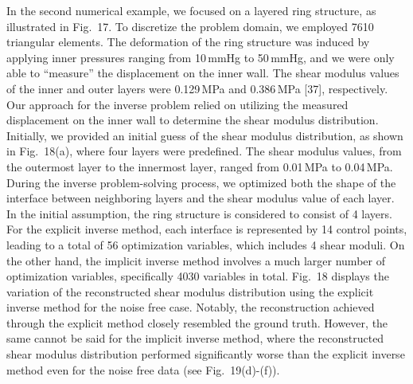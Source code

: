 \documentclass[11pt]{article}
\begin{document}
\noindent
In the second numerical example, we focused on a layered ring
structure, as illustrated in Fig.~17. To discretize the problem
domain, we employed 7610 triangular elements. The deformation of
the ring structure was induced by applying inner pressures ranging
from 10\,mmHg to 50\,mmHg, and we were only able to ``measure'' the
displacement on the inner wall. The shear modulus values of the
inner and outer layers were 0.129\,MPa and 0.386\,MPa [37],
respectively. Our approach for the inverse problem relied on
utilizing the measured displacement on the inner wall to determine
the shear modulus distribution. Initially, we provided an initial
guess of the shear modulus distribution, as shown in Fig.~18(a),
where four layers were predefined. The shear modulus values, from
the outermost layer to the innermost layer, ranged from 0.01\,MPa
to 0.04\,MPa. During the inverse problem-solving process, we
optimized both the shape of the interface between neighboring
layers and the shear modulus value of each layer. In the initial
assumption, the ring structure is considered to consist of 4
layers. For the explicit inverse method, each interface is
represented by 14 control points, leading to a total of 56
optimization variables, which includes 4 shear moduli. On the
other hand, the implicit inverse method involves a much larger
number of optimization variables, specifically 4030 variables in
total. Fig.~18 displays the variation of the reconstructed shear
modulus distribution using the explicit inverse method for the
noise free case. Notably, the reconstruction achieved through the
explicit method closely resembled the ground truth. However, the
same cannot be said for the implicit inverse method, where the
reconstructed shear modulus distribution performed significantly
worse than the explicit inverse method even for the noise free
data (see Fig.~19(d)-(f)).


\newpage

\end{document}
